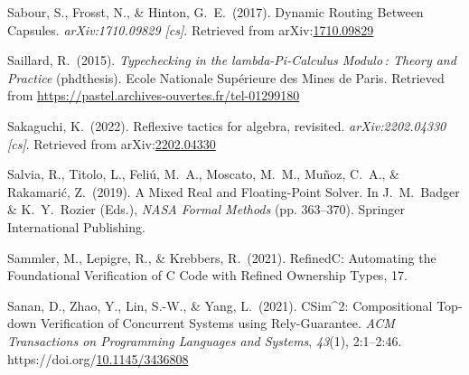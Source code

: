 \documentclass[12pt,twoside]{article}
\begin{document}
{\begin{thebibliography}{1079}
\mdbibitemlabel{}Sabour, S., Frosst, N., \& Hinton, G.~E.~(2017). Dynamic Routing Between Capsules. \emph{arXiv:1710.09829 {}[cs]}. Retrieved from arXiv:\href{http://arxiv.org/abs/1710.09829}{1710.09829}%

\mdbibitemlabel{}Saillard, R.~(2015). \emph{Typechecking in the lambda-Pi-Calculus Modulo : Theory and Practice} (phdthesis). Ecole Nationale Supérieure des Mines de Paris. Retrieved from \href{https://pastel.archives-ouvertes.fr/tel-01299180}{{\ttfamily https://\hspace{0pt}pastel.\hspace{0pt}archives-\hspace{0pt}ouvertes.\hspace{0pt}fr/\hspace{0pt}tel-\hspace{0pt}01299180}}%

\mdbibitemlabel{}Sakaguchi, K.~(2022). Reflexive tactics for algebra, revisited. \emph{arXiv:2202.04330 {}[cs]}. Retrieved from arXiv:\href{http://arxiv.org/abs/2202.04330}{2202.04330}%

\mdbibitemlabel{}Salvia, R., Titolo, L., Feliú, M.~A., Moscato, M.~M., Muñoz, C.~A., \& Rakamarić, Z.~(2019). A Mixed Real and Floating-Point Solver. In J.~M.~Badger \& K.~Y.~Rozier (Eds.), \emph{NASA Formal Methods} (pp. 363–370). Springer International Publishing.%

\mdbibitemlabel{}Sammler, M., Lepigre, R., \& Krebbers, R.~(2021). RefinedC: Automating the Foundational Verification of C Code with Refined Ownership Types, 17.%

\mdbibitemlabel{}Sanan, D., Zhao, Y., Lin, S.-W., \& Yang, L.~(2021). CSim\textasciicircum{}2: Compositional Top-down Verification of Concurrent Systems using Rely-Guarantee. \emph{ACM Transactions on Programming Languages and Systems}, \emph{43}(1), 2:1–2:46. https://doi.org/\href{https://dx.doi.org/10.1145/3436808}{10.1145/3436808}%


\end{thebibliography}}
\end{document}
